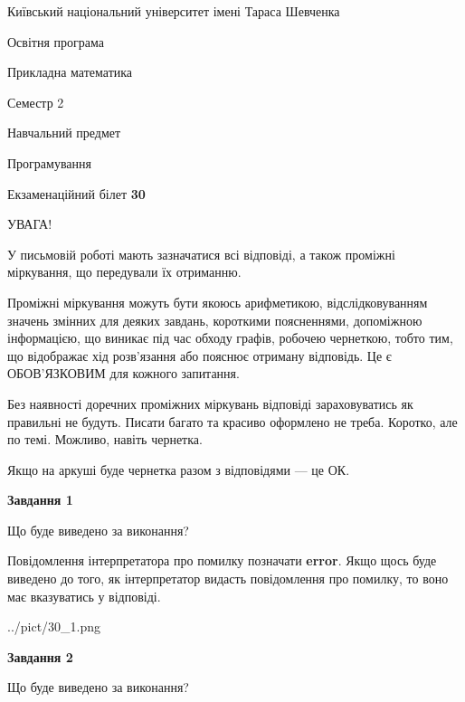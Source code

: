 \documentclass[12pt, ukrainian]{article}
\begin{document}
{{\begin {small}\par
{ \center  Київський національний університет імені Тараса Шевченка \par}
{\parbox {5 cm}{Освітня програма \hfill}{\parbox {7 cm}{Прикладна математика \hfill}}\parbox {6 cm}{\hfill Семестр 2}}\par
{\parbox {5 cm} {Навчальний предмет \hfill}\parbox {7 cm}{Програмування \hfill}\parbox {6cm}{\hfill}\par}\vspace{-7pt} \end{small}}{\center Екзаменаційний білет \No \textbf
{ 30 }\par}}
{
\begin {large}
УВАГА!

У письмовій роботі мають зазначатися всі відповіді, а також проміжні міркування, що передували їх отриманню.

Проміжні міркування можуть бути якоюсь арифметикою, відслідковуванням зна\-чень змінних для деяких завдань,
короткими поясненнями, допоміжною інформацією, що виникає під час обходу графів, робочею чернеткою,
тобто тим, що відображає хід розв’язання або пояснює отриману відповідь.
Це є ОБОВ’ЯЗКОВИМ для кожного запитання.

Без наявності доречних проміжних міркувань відповіді зараховуватись як правиль\-ні не будуть.
Писати багато та красиво оформлено не треба. Коротко, але по темі. Можли\-во, навіть чернетка.

Якщо на аркуші буде чернетка разом з відповідями --- це ОК.

\newpage

{\begin {center}\textbf{Завдання 1}\end {center}}\par
Що буде виведено за виконання?

Повідомлення інтерпретатора про помилку позначати \textbf{error}.
Якщо щось буде виведено до того, як інтерпретатор видасть повідомлення про помилку, 
то воно має вказуватись у відповіді. \par


\begin{center}
	{../pict/30_1.png}
\end{center}
\newpage

{\begin {center}\textbf{Завдання 2}\end {center}}\par
Що буде виведено за виконання?


\end{large}}
\end{document}
